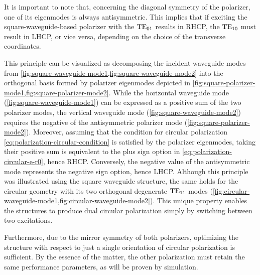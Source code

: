 \documentclass[11pt,a4paper,twoside,openany]{report}
\begin{document}
\begin{remark}
    \label{remark:dual-polarization-capatibility}
    It is important to note that, concerning the diagonal symmetry of the polarizer, one of its eigenmodes is always antisymmetric. This implies that if exciting the square-waveguide-based polarizer with the $\text{TE}_{01}$ results in RHCP, the $\text{TE}_{10}$ must result in LHCP, or vice versa, depending on the choice of the transverse coordinates.
    
    This principle can be visualized as decomposing the incident waveguide modes from \cref{fig:square-waveguide-mode1,fig:square-waveguide-mode2} into the orthogonal basis formed by polarizer eigenmodes depicted in \cref{fig:square-polarizer-mode1,fig:square-polarizer-mode2}. While the horizontal waveguide mode (\cref{fig:square-waveguide-mode1}) can be expressed as a positive sum of the two polarizer modes, the vertical waveguide mode (\cref{fig:square-waveguide-mode2}) requires the negative of the antisymmetric polarizer mode (\cref{fig:square-polarizer-mode2}). Moreover, assuming that the condition for circular polarization \eqref{eq:polarization-circular-condition} is satisfied by the polarizer eigenmodes, taking their positive sum is equivalent to the plus sign option in \cref{eq:polarization-circular-e-r0}, hence RHCP. Conversely, the negative value of the antisymmetric mode represents the negative sign option, hence LHCP. Although this principle was illustrated using the square waveguide structure, the same holds for the circular geometry with its two orthogonal degenerate $\text{TE}_{11}$ modes (\cref{fig:circular-waveguide-mode1,fig:circular-waveguide-mode2}). This unique property enables the structures to produce dual circular polarization simply by switching between two excitations.

    Furthermore, due to the mirror symmetry of both polarizers, optimizing the structure with respect to just a single orientation of circular polarization is sufficient. By the essence of the matter, the other polarization must retain the same performance parameters, as will be proven by simulation.
\end{remark}
\end{document}
